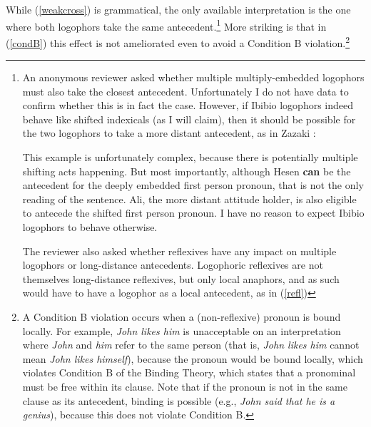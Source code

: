 \documentclass[output=paper]{langscibook}
\begin{document}
While (\ref{weakcross}) is grammatical, the only available interpretation is the one where both logophors take the same antecedent.\footnote{An 
    anonymous reviewer asked whether multiple multiply-embedded logophors must also take the closest antecedent. Unfortunately I do not have data to confirm whether this is in fact the case. However, if Ibibio logophors indeed behave like shifted indexicals (as I will claim), then it should be possible for the two logophors to take a more distant antecedent, as in Zazaki \citep{Anand2004}:
    \begin{exe}
    	\label{complicated}
    \end{exe}
    This example is unfortunately complex, because there is potentially multiple shifting acts happening. But most importantly, although Hesen \textbf{can} be the antecedent for the deeply embedded first person pronoun, that is not the only reading of the sentence. Ali, the more distant attitude holder, is also eligible to antecede the shifted first person pronoun. I have no reason to expect Ibibio logophors to behave otherwise.
    
    The reviewer also asked whether reflexives have any impact on multiple logophors or long-distance antecedents. Logophoric reflexives are not themselves long-distance reflexives, but only local anaphors, and as such would have to have a logophor as a local antecedent, as in (\ref{refl})
}
More striking is that in (\ref{condB}) this effect is not ameliorated even to avoid a Condition B violation.\footnote{A
    Condition B violation occurs when a (non-reflexive) pronoun is bound locally. For example, \textit{John likes him} is unacceptable on an interpretation where \textit{John} and \textit{him} refer to the same person (that is, \textit{John likes him} cannot mean \textit{John likes himself}), because the pronoun would be bound locally, which violates Condition B of the Binding Theory, which states that a pronominal must be free within its clause. Note that if the pronoun is not in the same clause as its antecedent, binding is possible (e.g., \textit{John said that he is a genius}), because this does not violate Condition B.
}
\end{document}
